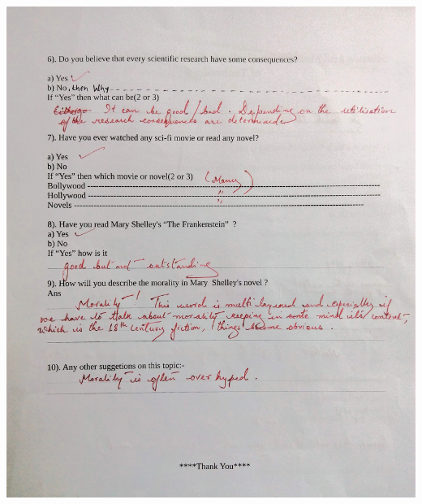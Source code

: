 \documentclass[12pt]{report}
\begin{document}
\includegraphics[width=6in,height=9in]{a4.jpg}
\end{document}
